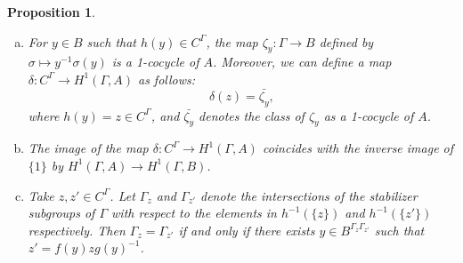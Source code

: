 \documentclass[10pt,a4paper]{amsart}
\numberwithin{equation}{section}
\theoremstyle{plain}
\newtheorem{prop}[theo]{Proposition}
\theoremstyle{definition}
\begin{document}
\begin{prop}\label{lk}
  \begin{enumerate}[(a)]
    \item\label{lk-1} For $y\in B$ such that $h(y)\in C^\Gamma$, the map $\zeta_y:\Gamma\to B$ defined by $\sigma\mapsto y^{-1}\sigma(y)$ is a 1-cocycle of $A$. Moreover, we can define a map $\delta:C^\Gamma\to H^1(\Gamma,A)$ as follows:
  \begin{equation}
\delta(z)=\bar{\zeta_y},
\end{equation}
where $h(y)=z\in C^\Gamma$, and $\bar{\zeta_y}$ denotes the class of $\zeta_y$ as a 1-cocycle of $A$.
\item\label{lk-3} The image of the map $\delta:C^\Gamma\to H^1(\Gamma,A)$ coincides with the inverse image of $\{1\}$ by $H^1(\Gamma,A)\to H^1(\Gamma,B)$.
\item\label{lk-4} Take $z,z'\in C^\Gamma$. Let $\Gamma_z$ and $\Gamma_{z'}$ denote the intersections of the stabilizer subgroups of $\Gamma$ with respect to the elements in $h^{-1}(\{z\})$ and $h^{-1}(\{z'\})$ respectively. Then $\Gamma_z=\Gamma_{z'}$ if and only if there exists $y\in B^{\Gamma_z\Gamma_{z'}}$ such that $z'=f(y)zg(y)^{-1}$.
\end{enumerate}
\end{prop}
\end{document}
